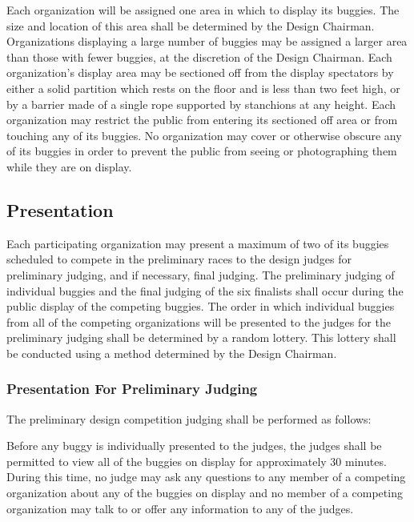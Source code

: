 	Each organization will be assigned one area in which to display its buggies.
	The size and location of this area shall be determined by the Design Chairman.
	Organizations displaying a large number of buggies may be assigned a larger
	area than those with fewer buggies, at the discretion of the Design Chairman.
	Each organization's display area may be sectioned off from the display
	spectators by either a solid partition which rests on the floor and is less
	than two feet high, or by a barrier made of a single rope supported by
	stanchions at any height. Each organization may restrict the public from
	entering its sectioned off area or from touching any of its buggies. No
	organization may cover or otherwise obscure any of its buggies in order to
	prevent the public from seeing or photographing them while they are on display.

\subsection{Presentation}

	Each participating organization may present a maximum of two of its buggies
	scheduled to compete in the preliminary races to the design judges for
	preliminary judging, and if necessary, final judging. The preliminary judging
	of individual buggies and the final judging of the six finalists shall occur
	during the public display of the competing buggies. The order in which
	individual buggies from all of the competing organizations will be presented to
	the judges for the preliminary judging shall be determined by a random lottery.
	This lottery shall be conducted using a method determined by the Design
	Chairman.

\subsubsection{Presentation For Preliminary Judging}

	The preliminary design competition judging shall be performed as follows:
	\newline
	
	Before any buggy is individually presented to the judges, the judges shall be
	permitted to view all of the buggies on display for approximately 30 minutes.
	During this time, no judge may ask any questions to any member of a competing
	organization about any of the buggies on display and no member of a competing
	organization may talk to or offer any information to any of the judges.

